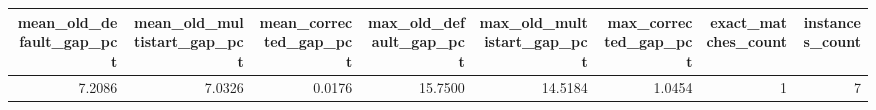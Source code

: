 \begin{tabular}{rrrrrrrr}
\toprule
mean_old_default_gap_pct & mean_old_multistart_gap_pct & mean_corrected_gap_pct & max_old_default_gap_pct & max_old_multistart_gap_pct & max_corrected_gap_pct & exact_matches_count & instances_count \\
\midrule
7.2086 & 7.0326 & 0.0176 & 15.7500 & 14.5184 & 1.0454 & 1 & 7 \\
\bottomrule
\end{tabular}
